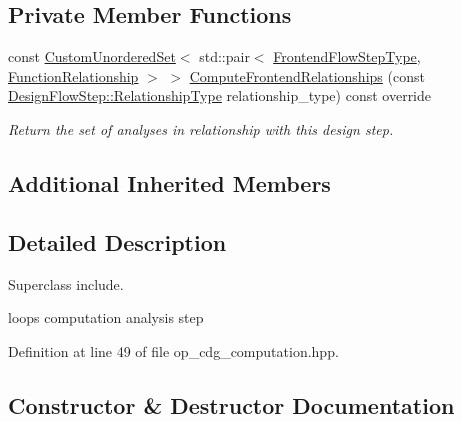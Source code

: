 \subsection*{Private Member Functions}
\begin{DoxyCompactItemize}
\item 
const \hyperlink{classCustomUnorderedSet}{Custom\+Unordered\+Set}$<$ std\+::pair$<$ \hyperlink{frontend__flow__step_8hpp_afeb3716c693d2b2e4ed3e6d04c3b63bb}{Frontend\+Flow\+Step\+Type}, \hyperlink{classFrontendFlowStep_af7cf30f2023e5b99e637dc2058289ab0}{Function\+Relationship} $>$ $>$ \hyperlink{classOpCdgComputation_a73ae2a7476108bdceae7b11d488fad81}{Compute\+Frontend\+Relationships} (const \hyperlink{classDesignFlowStep_a723a3baf19ff2ceb77bc13e099d0b1b7}{Design\+Flow\+Step\+::\+Relationship\+Type} relationship\+\_\+type) const override
\begin{DoxyCompactList}\small\item\em Return the set of analyses in relationship with this design step. \end{DoxyCompactList}\end{DoxyCompactItemize}
\subsection*{Additional Inherited Members}


\subsection{Detailed Description}
Superclass include. 

loops computation analysis step 

Definition at line 49 of file op\+\_\+cdg\+\_\+computation.\+hpp.



\subsection{Constructor \& Destructor Documentation}
\mbox{\label{classOpCdgComputation_a722516aa82eef7e012cad2ee897ce59d}} 
